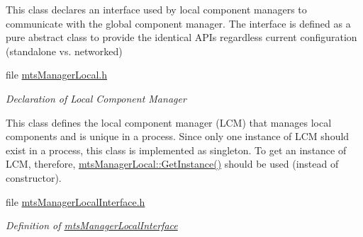 \begin{DoxyCompactItemize}
\begin{DoxyCompactList}
This class declares an interface used by local component managers to communicate with the global component manager. The interface is defined as a pure abstract class to provide the identical A\-P\-Is regardless current configuration (standalone vs. networked) \end{DoxyCompactList}\item 
file \hyperlink{mts_manager_local_8h}{mts\-Manager\-Local.\-h}
\begin{DoxyCompactList}\small\item\em Declaration of Local Component Manager

This class defines the local component manager (L\-C\-M) that manages local components and is unique in a process. Since only one instance of L\-C\-M should exist in a process, this class is implemented as singleton. To get an instance of L\-C\-M, therefore, \hyperlink{classmts_manager_local_a025cb3746e1e69b07723066b562ac5cd}{mts\-Manager\-Local\-::\-Get\-Instance()} should be used (instead of constructor). \end{DoxyCompactList}\item 
file \hyperlink{mts_manager_local_interface_8h}{mts\-Manager\-Local\-Interface.\-h}
\begin{DoxyCompactList}\small\item\em Definition of \hyperlink{classmts_manager_local_interface}{mts\-Manager\-Local\-Interface}


\end{DoxyCompactList}
\end{DoxyCompactItemize}
